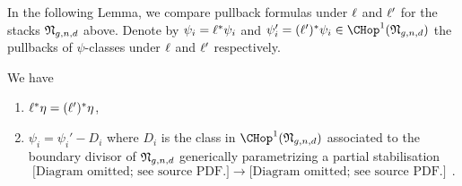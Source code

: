 In the following Lemma, we compare pullback formulas under $\ell$ and $\ell'$ for the stacks $\frak N_{g,n,d}$ above. Denote by $\psi_i = \ell^*\psi_i$ and $\psi_i' = (\sourcemap)^*\psi_i \in \CHop^1(\frak N_{g,n,d})$ the pullbacks of $\psi$-classes under $\ell$ and  $\ell'$
respectively.


\begin{lemma}
\notready\label{lem:pullback_comparison}
We have
\begin{enumerate}[label=(\arabic*)]
    \item[(i)] $\ell^*\eta = (\ell')^*\eta$,
    \item[(ii)]  $\psi_i = \psi_i' - D_i$ where $D_i$ is the class in $\CHop^1(\frak N_{g,n,d})$ associated to the boundary divisor of $\frak N_{g,n,d}$ generically parametrizing a partial stabilisation
\[
\text{[Diagram omitted; see source PDF.]}
\to
\text{[Diagram omitted; see source PDF.]}\ \ .
\]
\end{enumerate}
\end{lemma}
